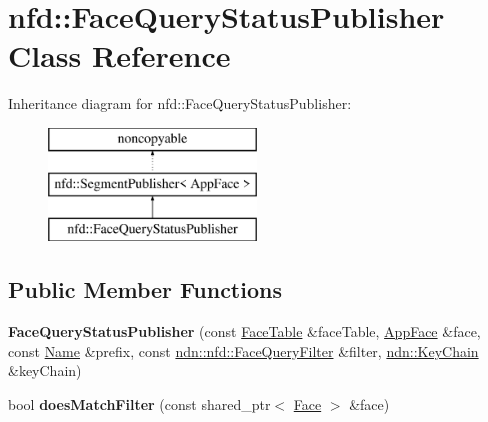 \hypertarget{classnfd_1_1FaceQueryStatusPublisher}{}\section{nfd\+:\+:Face\+Query\+Status\+Publisher Class Reference}
\label{classnfd_1_1FaceQueryStatusPublisher}
Inheritance diagram for nfd\+:\+:Face\+Query\+Status\+Publisher\+:\begin{figure}[H]
\begin{center}
\leavevmode
\includegraphics[height=3.000000cm]{classnfd_1_1FaceQueryStatusPublisher}
\end{center}
\end{figure}
\subsection*{Public Member Functions}
\begin{DoxyCompactItemize}
\item 
{\bfseries Face\+Query\+Status\+Publisher} (const \hyperlink{classnfd_1_1FaceTable}{Face\+Table} \&face\+Table, \hyperlink{classnfd_1_1AppFace}{App\+Face} \&face, const \hyperlink{classndn_1_1Name}{Name} \&prefix, const \hyperlink{classndn_1_1nfd_1_1FaceQueryFilter}{ndn\+::nfd\+::\+Face\+Query\+Filter} \&filter, \hyperlink{classndn_1_1security_1_1KeyChain}{ndn\+::\+Key\+Chain} \&key\+Chain)\hypertarget{classnfd_1_1FaceQueryStatusPublisher_a129b994870870b5524954b77233f5f0a}{}\label{classnfd_1_1FaceQueryStatusPublisher_a129b994870870b5524954b77233f5f0a}

\item 
bool {\bfseries does\+Match\+Filter} (const shared\+\_\+ptr$<$ \hyperlink{classnfd_1_1Face}{Face} $>$ \&face)\hypertarget{classnfd_1_1FaceQueryStatusPublisher_a3433344c42a3fd724eea3ba4b3e02bb6}{}\label{classnfd_1_1FaceQueryStatusPublisher_a3433344c42a3fd724eea3ba4b3e02bb6}

\end{DoxyCompactItemize}
